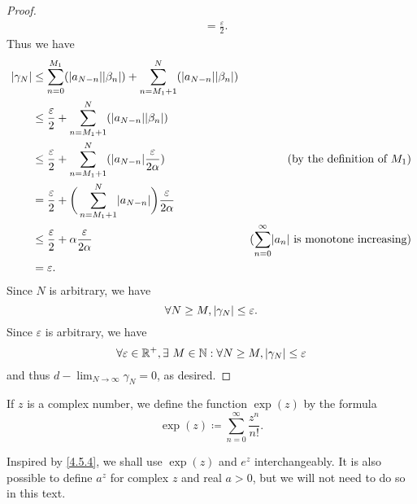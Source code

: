 \begin{proof}
\begin{align*}
                                                       & = \frac{\varepsilon}{2}.
  \end{align*}
  Thus we have
  \begin{align*}
    \abs{\gamma_N} & \leq \sum_{n = 0}^{M_1} (\abs{a_{N - n}} \abs{\beta_n}) + \sum_{n = M_1 + 1}^N (\abs{a_{N - n}} \abs{\beta_n})                                                                     \\
                   & \leq \frac{\varepsilon}{2} + \sum_{n = M_1 + 1}^N (\abs{a_{N - n}} \abs{\beta_n})                                                                                                  \\
                   & \leq \frac{\varepsilon}{2} + \sum_{n = M_1 + 1}^N (\abs{a_{N - n}} \frac{\varepsilon}{2 \alpha})               & \text{(by the definition of \(M_1\))}                             \\
                   & = \frac{\varepsilon}{2} + \bigg(\sum_{n = M_1 + 1}^N \abs{a_{N - n}}\bigg) \frac{\varepsilon}{2 \alpha}                                                                            \\
                   & \leq \frac{\varepsilon}{2} + \alpha \frac{\varepsilon}{2 \alpha}                                               & \text{(\(\sum_{n = 0}^\infty \abs{a_n}\) is monotone increasing)} \\
                   & = \varepsilon.
  \end{align*}
  Since \(N\) is arbitrary, we have
  \[
    \forall N \geq M, \left\lvert\gamma_N\right\rvert \leq \varepsilon.
  \]
  Since \(\varepsilon\) is arbitrary, we have
  \[
    \forall \varepsilon \in \mathbb{R}^+, \exists\ M \in \mathbb{N} : \forall N \geq M, \left\lvert\gamma_N\right\rvert \leq \varepsilon
  \]
  and thus \(d - \lim_{N \to \infty} \gamma_N = 0\), as desired.
\end{proof}

\begin{defn}\label{4.6.15}
  If \(z\) is a complex number, we define the function \(\exp(z)\) by the formula
  \[
    \exp(z) \coloneqq \sum_{n = 0}^\infty \frac{z^n}{n!}.
  \]
\end{defn}

\begin{note}
  Inspired by \cref{4.5.4}, we shall use \(\exp(z)\) and \(e^z\) interchangeably.
  It is also possible to define \(a^z\) for complex \(z\) and real \(a > 0\), but we will not need to do so in this text.
\end{note}

